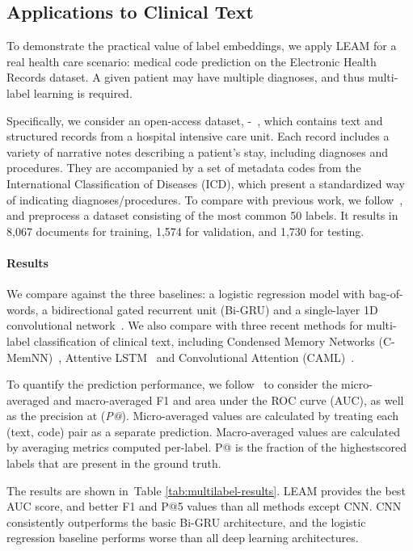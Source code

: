 \documentclass[11pt,a4paper]{article}
\begin{document}
\subsection{Applications to Clinical Text}
To demonstrate the practical value of label embeddings,
we apply LEAM for a real health care scenario: medical code prediction on the Electronic Health Records dataset. A given patient may have multiple diagnoses, and thus multi-label learning is required. 

Specifically, we consider an open-access dataset, -~\cite{johnson2016mimic}, which contains text and structured records from a hospital intensive care unit. 
Each record includes a variety of narrative notes describing a patient’s stay, including diagnoses and procedures. 
They are accompanied by a set of metadata codes from the International Classification of Diseases (ICD), which present a standardized way of indicating
diagnoses/procedures.
To compare with previous work, we follow~\cite{shi2017towards,mullenbach2018explainable}, and preprocess a dataset consisting of the most common 50 labels. It results in 8,067 documents for training, 1,574 for validation, and 1,730 for testing.


\paragraph{Results}

We compare against the three baselines: a logistic regression model with bag-of-words, a bidirectional gated recurrent unit (Bi-GRU) and a single-layer 1D convolutional network~\cite{kim2014convolutional}. We also compare with three recent methods for multi-label classification of clinical text, including Condensed Memory Networks (C-MemNN)~\cite{prakash2017condensed}, Attentive LSTM~\cite{shi2017towards} and Convolutional Attention (CAML)~\cite{mullenbach2018explainable}.

To quantify the prediction performance, we follow~\cite{mullenbach2018explainable} to consider the micro-averaged and macro-averaged F1 and area under the ROC curve (AUC), as well as the precision at  ({\it P@}). Micro-averaged values are calculated by treating each (text, code) pair as a separate prediction. Macro-averaged values are calculated by averaging metrics computed per-label. P@ is the fraction of the  highestscored labels that are present in the ground truth.

The results are shown in~Table \ref{tab:multilabel-results}. LEAM provides the best AUC score, and better F1 and P@5 values than all methods except CNN. CNN consistently outperforms the basic Bi-GRU architecture, and the logistic regression baseline performs worse than all deep learning architectures.
\end{document}
